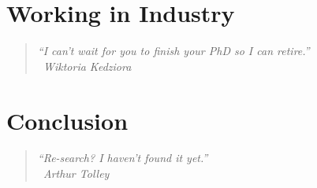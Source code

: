 \documentclass[a4paper,12pt,twoside]{report} %
\makeatletter
\newcommand{\chapterquote}[2]{
  \begin{quote}
    \color{darkgray}\itshape #1 \\[1ex] %
    \raggedleft %
    \textemdash\ #2
  \end{quote}
}
\renewcommand{\cleardoublepage}{%
  \clearpage%
  \if@twoside
    \ifodd\c@page
    \else
      \hbox{}%
      \thispagestyle{empty}%
      \newpage
    \fi
  \fi
}
\let\oldchapter\chapter
\renewcommand{\chapter}{\cleardoublepage\oldchapter}
\makeatother
\begin{document}
\chapter[Working in Industry]{\label{chapter:8-industry}Working in Industry}
\chapterquote{``I can't wait for you to finish your PhD so I can retire.''}{Wiktoria Kedziora}


\chapter[Conclusion]{\label{chapter:conclusion}Conclusion}
\chapterquote{``Re-search? I haven't found it yet.''}{Arthur Tolley}



\nocite{*}






\end{document}
